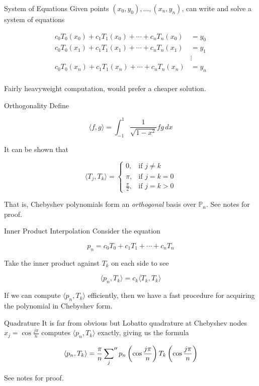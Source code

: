 \documentclass[pdf]{beamer}
\begin{document}
\begin{frame}{System of Equations}
  Given points $(x_0, y_0),\ldots,(x_n, y_n)$, can write and solve a system of equations

  \begin{align*}
  c_0T_0(x_0) + c_1T_1(x_0) + \cdots + c_nT_n(x_0) &= y_0\\
  c_0T_0(x_1) + c_1T_1(x_1) + \cdots + c_nT_n(x_1) &= y_1\\
   & \vdots\\
  c_0T_0(x_n) + c_1T_1(x_n) + \cdots + c_nT_n(x_n) &= y_n\\
  \end{align*}

  Fairly heavyweight computation, would prefer a cheaper solution.
\end{frame}

\begin{frame}{Orthogonality}
  Define

  \[ \langle f, g \rangle = \int_{-1}^1 \frac{1}{\sqrt{1-x^2}}fg \,dx \]

  It can be shown that
  
  \[ \langle T_j, T_k \rangle = \left\{
    \begin{array}{ll}
        0, & \text{if } j \neq k\\
        \pi, & \text{if } j = k = 0\\
        \frac{\pi}{2}, & \text{if } j = k > 0
    \end{array}
  \right.
  \]

  That is, Chebyshev polynomials form an \emph{orthogonal} basis
  over $\mathbb{P}_n$. See notes for proof.
\end{frame}


\begin{frame}{Inner Product Interpolation}
  Consider the equation

  \[ p_n = c_0T_0 + c_1T_1 + \cdots + c_nT_n \]

  Take the inner product against $T_k$ on each side to see

  \[ \langle p_n, T_k \rangle = c_k \langle T_k, T_k \rangle \]

  If we can compute $\langle p_n, T_k \rangle$ efficiently, then we have a fast
  procedure for acquiring the polynomial in Chebyshev form.
\end{frame}

\begin{frame}{Quadrature}
  It is far from obvious but Lobatto quadrature at
  Chebyshev nodes $x_j = \cos \frac{j\pi}{n}$ computes $\langle p_n, T_k \rangle$ exactly,
  giving us the formula

  \[ \langle p_n, T_k \rangle = \frac{\pi}{n} \sideset{}{''}\sum_j p_n\left(\cos \frac{j\pi}{n}\right) T_k\left(\cos \frac{j\pi}{n}\right) \]

  See notes for proof.
\end{frame}
\end{document}
